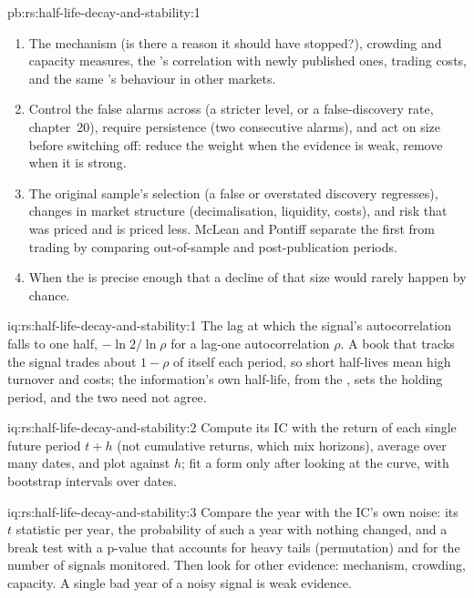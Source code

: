 \begin{solution}{pb:rs:half-life-decay-and-stability:1}
\begin{enumerate}
$\Phi(-t/\sqrt5) = 0.056$ (Interview question~6), $t = 3.6$.
\item The mechanism (is there a reason it should have stopped?), crowding and capacity measures, the 's correlation with newly published
ones, trading costs, and the same 's behaviour in other markets.
\item Control the false alarms across  (a stricter level, or a false-discovery rate, chapter~20), require persistence (two consecutive
alarms), and act on size before switching off: reduce the weight when the evidence is weak, remove when it is strong.
\item The original sample's selection (a false or overstated discovery regresses), changes in market structure (decimalisation, liquidity,
costs), and risk that was priced and is priced less. McLean and Pontiff separate the first from trading by comparing out-of-sample and
post-publication periods.
\item When the  is precise enough that a decline of that size would rarely happen by chance.
\end{enumerate}
\end{solution}

\begin{solution}{iq:rs:half-life-decay-and-stability:1}
The lag at which the signal's autocorrelation falls to one half, $-\ln 2/\ln\rho$ for a lag-one autocorrelation $\rho$. A book that tracks the
signal trades about $1 - \rho$ of itself each period, so short half-lives mean high turnover and costs; the information's own half-life, from the
, sets the holding period, and the two need not agree.
\end{solution}

\begin{solution}{iq:rs:half-life-decay-and-stability:2}
Compute its IC with the return of each single future period $t + h$ (not cumulative returns, which mix horizons), average over many dates, and plot
against $h$; fit a form only after looking at the curve, with bootstrap intervals over dates.
\end{solution}

\begin{solution}{iq:rs:half-life-decay-and-stability:3}
Compare the year with the IC's own noise: its $t$ statistic per year, the probability of such a year with nothing changed, and a break test with
a p-value that accounts for heavy tails (permutation) and for the number of signals monitored. Then look for other evidence: mechanism, crowding,
capacity. A single bad year of a noisy signal is weak evidence.
\end{solution}

